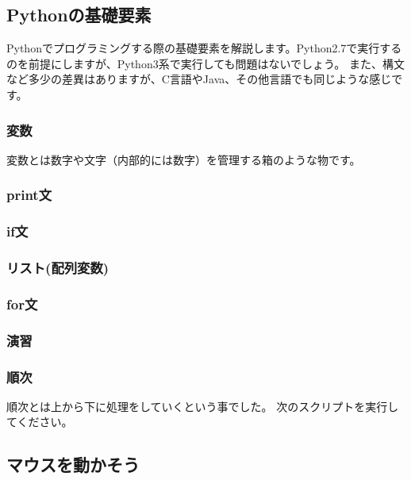 \documentclass[11pt,a4paper]{jsarticle}
\begin{document}
\subsection{Pythonの基礎要素}
Pythonでプログラミングする際の基礎要素を解説します。Python2.7で実行するのを前提にしますが、Python3系で実行しても問題はないでしょう。
また、構文など多少の差異はありますが、C言語やJava、その他言語でも同じような感じです。

\subsubsection{変数}
変数とは数字や文字（内部的には数字）を管理する箱のような物です。

\subsubsection{print文}
\subsubsection{if文}
\subsubsection{リスト(配列変数)}
\subsubsection{for文}
\subsubsection{演習}




\subsubsection{順次}
順次とは上から下に処理をしていくという事でした。
次のスクリプトを実行してください。



\newpage
\subsection{マウスを動かそう}


\end{document}
